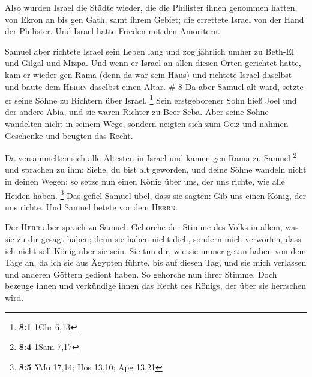  Also wurden Israel die Städte wieder, die die Philister
ihnen genommen hatten, von Ekron an bis gen Gath, samt ihrem Gebiet; die
errettete Israel von der Hand der Philister. Und Israel hatte Frieden
mit den Amoritern.

 Samuel aber richtete Israel sein Leben lang
 und zog jährlich umher zu Beth-El und Gilgal und Mizpa.
Und wenn er Israel an allen diesen Orten gerichtet hatte,
 kam er wieder gen Rama (denn da war sein Haus) und
richtete Israel daselbst und baute dem \textsc{Herrn} daselbst einen
Altar. \# 8  Da aber Samuel alt ward, setzte er seine
Söhne zu Richtern über Israel. \footnote{\textbf{8:1} 1Chr 6,13}
 Sein erstgeborener Sohn hieß Joel und der andere Abia,
und sie waren Richter zu Beer-Seba.  Aber seine Söhne
wandelten nicht in seinem Wege, sondern neigten sich zum Geiz und nahmen
Geschenke und beugten das Recht.

 Da versammelten sich alle Ältesten in Israel und kamen
gen Rama zu Samuel \footnote{\textbf{8:4} 1Sam 7,17}  und
sprachen zu ihm: Siehe, du bist alt geworden, und deine Söhne wandeln
nicht in deinen Wegen; so setze nun einen König über uns, der uns
richte, wie alle Heiden haben. \footnote{\textbf{8:5} 5Mo 17,14; Hos
  13,10; Apg 13,21}  Das gefiel Samuel übel, dass sie
sagten: Gib uns einen König, der uns richte. Und Samuel betete vor dem
\textsc{Herrn}.

 Der \textsc{Herr} aber sprach zu Samuel: Gehorche der
Stimme des Volks in allem, was sie zu dir gesagt haben; denn sie haben
nicht dich, sondern mich verworfen, dass ich nicht soll König über sie
sein.  Sie tun dir, wie sie immer getan haben von dem Tage
an, da ich sie aus Ägypten führte, bis auf diesen Tag, und sie mich
verlassen und anderen Göttern gedient haben.  So gehorche
nun ihrer Stimme. Doch bezeuge ihnen und verkündige ihnen das Recht des
Königs, der über sie herrschen wird.

